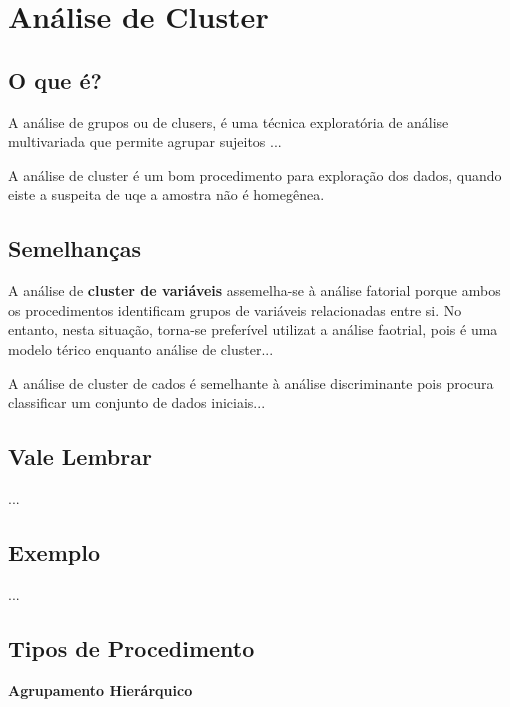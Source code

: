 \section{Análise de Cluster \cite{torres}}

	\subsection{O que é?}

        A análise de grupos ou de clusers, é uma técnica exploratória de análise multivariada que permite agrupar sujeitos ...
        
        A análise de cluster é um bom procedimento para exploração dos dados, quando eiste a suspeita de uqe a amostra não é homegênea.
        
    \subsection{Semelhanças}
    
        A análise de \textbf{cluster de variáveis} assemelha-se à análise fatorial porque ambos os procedimentos identificam grupos de variáveis relacionadas entre si. No entanto, nesta situação, torna-se preferível utilizat a análise faotrial, pois é uma modelo térico enquanto análise de cluster...
        
        A análise de cluster de cados é semelhante à análise discriminante pois procura classificar um conjunto de dados iniciais...
        
    \subsection{Vale Lembrar}
    
        ...
        
    \subsection{Exemplo}
    
        ...
        
    \subsection{Tipos de Procedimento}
    
        \textbf{Agrupamento Hierárquico}